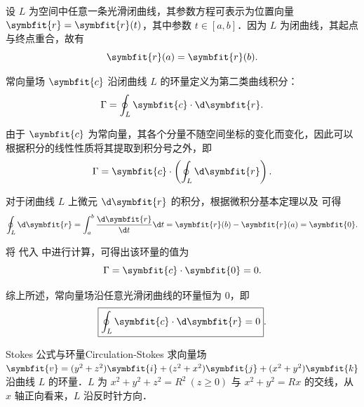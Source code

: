 \begin{myproof}
    设 $L$ 为空间中任意一条光滑闭曲线，其参数方程可表示为位置向量 $\symbfit{r} = \symbfit{r}(t)$，其中参数 $t \in [a, b]$．因为 $L$ 为闭曲线，其起点与终点重合，故有
    \begin{equation}
        \label{eq:closed-curve}
        \symbfit{r}(a) = \symbfit{r}(b).
    \end{equation}

    常向量场 $\symbfit{c}$ 沿闭曲线 $L$ 的环量定义为第二类曲线积分：
    \begin{equation}
        \label{eq:circulation-def}
        \Gamma = \oint_L \symbfit{c} \cdot \d\symbfit{r}.
    \end{equation}

    由于 $\symbfit{c}$ 为常向量，其各个分量不随空间坐标的变化而变化，因此可以根据积分的线性性质将其提取到积分号之外，即
    \begin{equation}
        \label{eq:circulation-extract}
        \Gamma = \symbfit{c} \cdot \left( \oint_L \d\symbfit{r} \right).
    \end{equation}

    对于闭曲线 $L$ 上微元 $\d\symbfit{r}$ 的积分，根据微积分基本定理以及  可得
    \begin{equation}
        \label{eq:integral-dr}
        \oint_L \d\symbfit{r} = \int_a^b \frac{\d\symbfit{r}}{\d t} \d t = \symbfit{r}(b) - \symbfit{r}(a) = \symbfit{0}.
    \end{equation}

    将  代入  中进行计算，可得出该环量的值为
    \begin{equation}
        \label{eq:circulation-calc}
        \Gamma = \symbfit{c} \cdot \symbfit{0} = 0.
    \end{equation}

    综上所述，常向量场沿任意光滑闭曲线的环量恒为 $0$，即
    \begin{equation}
        \label{eq:final-proof-3}
        \boxed{\oint_L \symbfit{c} \cdot \d\symbfit{r} = 0}.
    \end{equation}
\end{myproof}

\begin{problem}{Stokes 公式与环量}{Circulation-Stokes}
    求向量场 $\symbfit{v} = (y^2+z^2)\symbfit{i} + (z^2+x^2)\symbfit{j} + (x^2+y^2)\symbfit{k}$ 沿曲线 $L$ 的环量．$L$ 为 $x^2+y^2+z^2=R^2 \ (z \geqslant 0)$ 与 $x^2+y^2=Rx$ 的交线，从 $x$ 轴正向看来，$L$ 沿反时针方向．
\end{problem}

